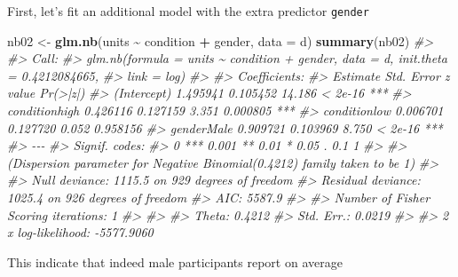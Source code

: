 \documentclass[
]{book}
\newenvironment{Shaded}{\begin{snugshade}}{\end{snugshade}}
\newcommand{\AttributeTok}[1]{\textcolor[rgb]{0.13,0.29,0.53}{#1}}
\newcommand{\CommentTok}[1]{\textcolor[rgb]{0.56,0.35,0.01}{\textit{#1}}}
\newcommand{\FunctionTok}[1]{\textcolor[rgb]{0.13,0.29,0.53}{\textbf{#1}}}
\newcommand{\NormalTok}[1]{#1}
\newcommand{\OtherTok}[1]{\textcolor[rgb]{0.56,0.35,0.01}{#1}}
\newcommand{\SpecialCharTok}[1]{\textcolor[rgb]{0.81,0.36,0.00}{\textbf{#1}}}
\begin{document}
First, let's fit an additional model with the extra predictor \texttt{gender}

\begin{Shaded}
\begin{Highlighting}[]
\NormalTok{nb02 }\OtherTok{\textless{}{-}} \FunctionTok{glm.nb}\NormalTok{(units }\SpecialCharTok{\textasciitilde{}}\NormalTok{ condition }\SpecialCharTok{+}\NormalTok{ gender, }\AttributeTok{data =}\NormalTok{ d)}
\FunctionTok{summary}\NormalTok{(nb02)}
\CommentTok{\#\textgreater{} }
\CommentTok{\#\textgreater{} Call:}
\CommentTok{\#\textgreater{} glm.nb(formula = units \textasciitilde{} condition + gender, data = d, init.theta = 0.4212084665, }
\CommentTok{\#\textgreater{}     link = log)}
\CommentTok{\#\textgreater{} }
\CommentTok{\#\textgreater{} Coefficients:}
\CommentTok{\#\textgreater{}               Estimate Std. Error z value Pr(\textgreater{}|z|)    }
\CommentTok{\#\textgreater{} (Intercept)   1.495941   0.105452  14.186  \textless{} 2e{-}16 ***}
\CommentTok{\#\textgreater{} conditionhigh 0.426116   0.127159   3.351 0.000805 ***}
\CommentTok{\#\textgreater{} conditionlow  0.006701   0.127720   0.052 0.958156    }
\CommentTok{\#\textgreater{} genderMale    0.909721   0.103969   8.750  \textless{} 2e{-}16 ***}
\CommentTok{\#\textgreater{} {-}{-}{-}}
\CommentTok{\#\textgreater{} Signif. codes:  }
\CommentTok{\#\textgreater{} 0 \textquotesingle{}***\textquotesingle{} 0.001 \textquotesingle{}**\textquotesingle{} 0.01 \textquotesingle{}*\textquotesingle{} 0.05 \textquotesingle{}.\textquotesingle{} 0.1 \textquotesingle{} \textquotesingle{} 1}
\CommentTok{\#\textgreater{} }
\CommentTok{\#\textgreater{} (Dispersion parameter for Negative Binomial(0.4212) family taken to be 1)}
\CommentTok{\#\textgreater{} }
\CommentTok{\#\textgreater{}     Null deviance: 1115.5  on 929  degrees of freedom}
\CommentTok{\#\textgreater{} Residual deviance: 1025.4  on 926  degrees of freedom}
\CommentTok{\#\textgreater{} AIC: 5587.9}
\CommentTok{\#\textgreater{} }
\CommentTok{\#\textgreater{} Number of Fisher Scoring iterations: 1}
\CommentTok{\#\textgreater{} }
\CommentTok{\#\textgreater{} }
\CommentTok{\#\textgreater{}               Theta:  0.4212 }
\CommentTok{\#\textgreater{}           Std. Err.:  0.0219 }
\CommentTok{\#\textgreater{} }
\CommentTok{\#\textgreater{}  2 x log{-}likelihood:  {-}5577.9060}
\end{Highlighting}
\end{Shaded}

This indicate that indeed male participants report on average
\end{document}
